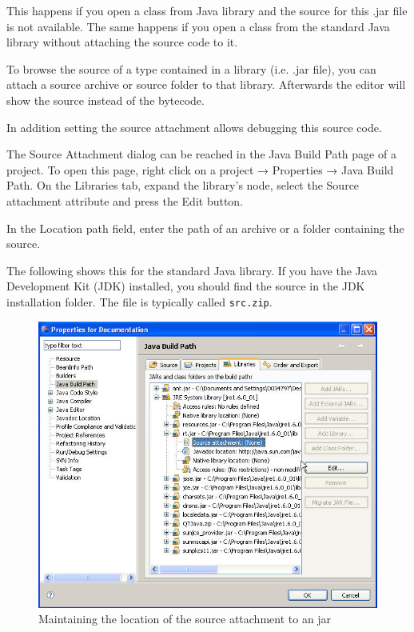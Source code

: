 This happens if you open a class from Java library and the source for
this .jar file is not available. The same happens if you open a class
from the standard Java library without attaching the source code to it.

To browse the source of a type contained in a library (i.e. .jar file),
you can attach a source archive or source folder to that library.
Afterwards the editor will show the source instead of the bytecode.

In addition setting the source attachment allows debugging this source
code.

The Source Attachment dialog can be reached in the Java Build Path page
of a project. To open this page, right click on a project → Properties →
Java Build Path. On the Libraries tab, expand the library's node, select
the Source attachment attribute and press the Edit button.

In the Location path field, enter the path of an archive or a folder
containing the source.

The following shows this for the standard Java library. If you have the
Java Development Kit (JDK) installed, you should find the source in the
JDK installation folder. The file is typically called \texttt{src.zip}.

\begin{figure}[htbp]
\centering
\includegraphics[scale=.5]{images/attach}
\caption{Maintaining the location of the source attachment to an jar}
\end{figure}

